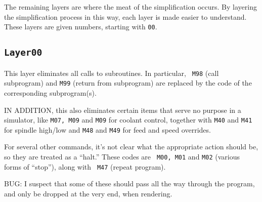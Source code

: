 \documentclass[titlepage,oneside,10pt]{article}
\begin{document}
The remaining layers are where the meat of the simplification
occurs. By layering the simplification process in this way, each layer
is made easier to understand. These layers are given numbers, starting
with {\tt 00}.

\subsection{\tt Layer00}

This layer eliminates all calls to subroutines. In particular, {\tt
  M98} (call subprogram) and {\tt M99} (return from subprogram) are
replaced by the code of the corresponding subprogram(s).

IN ADDITION, this also eliminates certain items that serve no purpose
in a simulator, like {\tt M07, M09} and {\tt M09} for coolant
control, together with {\tt M40} and {\tt M41} for spindle high/low
and {\tt M48} and {\tt M49} for feed and speed overrides.

For several other commands, it's not clear what the appropriate action
should be, so they are treated as a ``halt.'' These codes are {\tt
  M00, M01} and {\tt M02} (various forms of ``stop''), along with {\tt
  M47} (repeat program).

BUG: I suspect that some of these should pass all the way through the
program, and only be dropped at the very end, when rendering.
\end{document}
